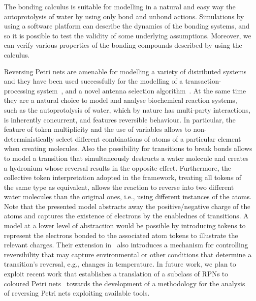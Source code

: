 \documentclass[runningheads]{llncs}
\begin{document}
The bonding calculus is suitable for modelling in a natural and easy way the autoprotolysis of water by using only bond and unbond actions. Simulations by using a software platform can describe the dynamics of the bonding systems, and so it is possible to test the validity of some underlying assumptions. Moreover, we can verify various properties of the bonding compounds described by using the calculus.


Reversing Petri nets are amenable for modelling
a variety of distributed systems and they have been used successfully for
the modelling of a transaction-processing system~\cite{RPNs}, and a novel antenna selection  algorithm~\cite{RC19}. At the same time they are a natural choice to model and analyse biochemical reaction systems, such as the autoprotolysis of water, which by nature
has multi-party interactions, is inherently concurrent, and features reversible behaviour. 
In particular, the feature of token multiplicity and
the use of variables allows to non-deterministically
select different combinations of atoms of a particular element when creating molecules. Also the possibility for
transitions to break bonds allows to model a transition that simultaneously
destructs  a water molecule and creates a hydronium whose  reversal results in the opposite effect. Furthermore,
the collective token interpretation adopted in the framework, treating all tokens of the same type
as equivalent, allows the reaction to reverse into two different water molecules than the original ones,
i.e., using different instances of the atoms.
Note that the presented model abstracts away the positive/negative charge of the atoms and
captures the existence of electrons by the enablednes of transitions. A model at a lower
level of abstraction would be possible by introducing tokens to represent the electrons  bonded to the associated
atom tokens to illustrate the relevant charges.
Their extension in~\cite{RC19} also introduces
a mechanism for controlling reversibility%
 that may capture environmental or other conditions that determine a transition's
reversal, e.g., changes in temperature. In future work, we plan to exploit recent work that establishes a translation of a subclass of RPNs to coloured Petri nets~\cite{RPNtoCPN} towards the development of a methodology for the analysis of reversing Petri nets exploiting available tools.
\end{document}
